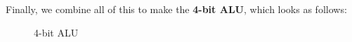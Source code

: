 \documentclass[a4paper, titlepage]{article}
\begin{document}
Finally, we combine all of this to make the \textbf{4-bit ALU}, which looks as follows:
\begin{figure}[htp!]
    \centering
    \hypertarget{4ALU}{}
    \caption{4-bit ALU}
    \label{fig:fig22}
\end{figure}
\end{document}
